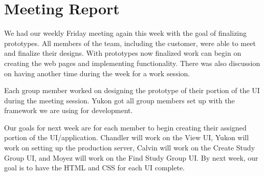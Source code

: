 \documentclass[12pt,letterpaper]{article}
\begin{document}
\clearpage
\section{Meeting Report}
We had our weekly Friday meeting again this week with the goal of finalizing prototypes. All members of the team, including the customer, were able to meet and finalize their designs. With prototypes now finalized work can begin on creating the web pages and implementing functionality. There was also discussion on having another time during the week for a work session. 

Each group member worked on designing the prototype of their portion of the UI during the meeting session. Yukon got all group members set up with the framework we are using for development. 

Our goals for next week are for each member to begin creating their assigned portion of the UI/application. Chandler will work on the View UI, Yukon will work on setting up the production server, Calvin will work on the Create Study Group UI, and Moyez will work on the Find Study Group UI. By next week, our goal is to have the HTML and CSS for each UI complete. 
\end{document}
